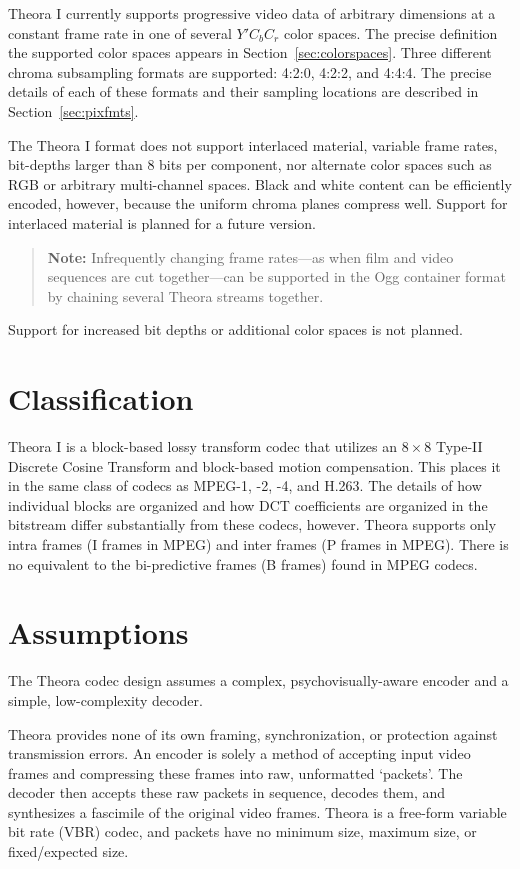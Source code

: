 \documentclass[11pt,letterpaper]{book}
\numberwithin{equation}{chapter}
\numberwithin{figure}{chapter}
\numberwithin{table}{chapter}
\begin{document}
Theora I currently supports progressive video data of arbitrary dimensions at a
 constant frame rate in one of several $Y'C_bC_r$ color spaces.
The precise definition the supported color spaces appears in
 Section~\ref{sec:colorspaces}.
Three different chroma subsampling formats are supported: 4:2:0, 4:2:2,
 and 4:4:4.
The precise details of each of these formats and their sampling locations are
 described in Section~\ref{sec:pixfmts}.

The Theora I format does not support interlaced material, variable frame rates,
 bit-depths larger than 8 bits per component, nor alternate color spaces such
 as RGB or arbitrary multi-channel spaces.
Black and white content can be efficiently encoded, however, because the
 uniform chroma planes compress well.
Support for interlaced material is planned for a future version.
\begin{verse}
{\bf Note:} Infrequently changing frame rates---as when film and video
 sequences are cut together---can be supported in the Ogg container format by
 chaining several Theora streams together.
\end{verse}
Support for increased bit depths or additional color spaces is not planned.

\section{Classification}

Theora I is a block-based lossy transform codec that utilizes an
 $8\times 8$ Type-II Discrete Cosine Transform and block-based motion
 compensation.
This places it in the same class of codecs as MPEG-1, -2, -4, and H.263.
The details of how individual blocks are organized and how DCT coefficients are
 organized in the bitstream differ substantially from these codecs, however.
Theora supports only intra frames (I frames in MPEG) and inter frames (P frames
 in MPEG).
There is no equivalent to the bi-predictive frames (B frames) found in MPEG
 codecs.

\section{Assumptions}

The Theora codec design assumes a complex, psychovisually-aware encoder and a
 simple, low-complexity decoder.

Theora provides none of its own framing, synchronization, or protection against
 transmission errors. 
An encoder is solely a method of accepting input video frames and
 compressing these frames into raw, unformatted `packets'.
The decoder then accepts these raw packets in sequence, decodes them, and
 synthesizes a fascimile of the original video frames.
Theora is a free-form variable bit rate (VBR) codec, and packets have no
 minimum size, maximum size, or fixed/expected size.
\end{document}
